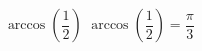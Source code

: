  {$\arccos \left( \dfrac{1}{2} \right)$ }
{ $\arccos \left( \dfrac{1}{2} \right) = \dfrac{\pi}{3}$}
